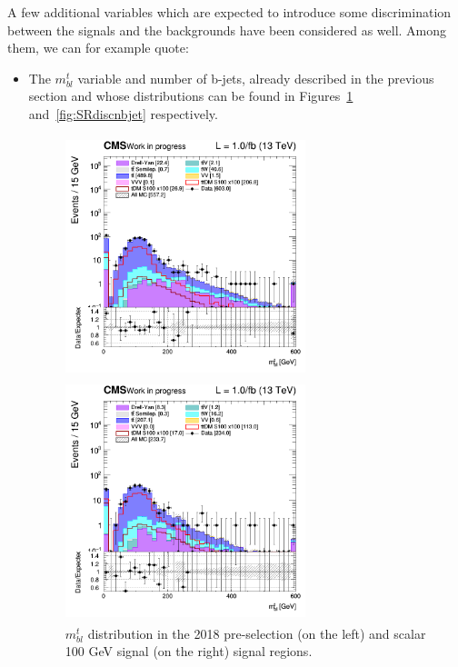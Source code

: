 \documentclass[a4paper, 10pt, openright]{report}
\begin{document}
A few additional variables which are expected to introduce some discrimination between the signals and the backgrounds have been considered as well. Among them, we can for example quote:
\begin{itemize}
\item The $m_{bl}^t$ variable and number of b-jets, already described in the previous section and whose distributions can be found in Figures~\ref{fig:SRdiscmblt} and~\ref{fig:SRdiscnbjet} respectively.

\begin{figure}[htbp]
\centering
\begin{minipage}[b]{.48\textwidth}
\includegraphics[width=7cm, height=7cm]{figs/2018/SRBlinded-ttDM-scalar100/log_cratio_topCR_ll_mblt.png}
\end{minipage}\hfill
\begin{minipage}[b]{.48\textwidth}
\includegraphics[width=7cm, height=7cm]{figs/2018/SRBlinded-ttDM-scalar100/log_cratio_topCR_ll_BDT_ttDM100_mblt.png}
\end{minipage} \hfill
\caption{$m_{bl}^t$ distribution in the 2018 pre-selection (on the left) and scalar 100 GeV signal (on the right) signal regions.}
\label{fig:SRdiscmblt}
\end{figure}


\end{itemize}
\end{document}

